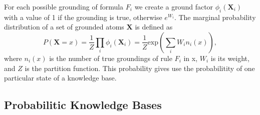 For each possible grounding of formula \(F_i\) we create a ground factor
\(\phi_i(\mathbf{X}_i)\) with a value of 1 if the grounding is true, otherwise
\(e^{W_i}\). The marginal probability distribution of a set of grounded atoms \(\mathbf{X}\) is defined as
\begin{equation}
\label{eq:probqa-marginal}
P(\mathbf{X} = x) = \frac{1}{Z} \prod_i \phi_i (\mathbf{X}_i) = \frac{1}{Z} \text{exp} \left( \sum_i W_i n_i(x) \right),
\end{equation}
where \(n_i(x)\) is the number of true groundings of rule \(F_i\) in x, \(W_i\) is its weight, and \(Z\) is the partition function.
This probability gives use the probabilitity of one particular state of a knowledge base.







\subsection{Probabilitic Knowledge Bases}

